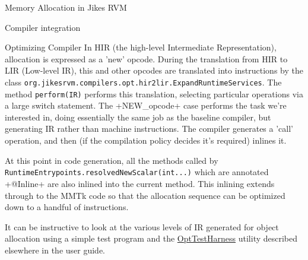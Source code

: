 \begin{section}{Memory Allocation in Jikes RVM}
\begin{subsection}{Compiler integration}
\begin{subsubsection}{Optimizing Compiler}
In HIR (the high-level Intermediate Representation), allocation is expressed as a 'new' opcode.  During the translation from HIR to LIR (Low-level IR), this and other opcodes are translated into instructions by the class \texttt{org.jikes\-rvm.com\-pi\-lers.opt.hir2lir.Ex\-pand\-Run\-time\-Ser\-vices}.  The method \texttt{per\-form(IR)} performs this translation, selecting particular operations via a large switch statement.  The \spverb+NEW_opcode+ case performs the task we're interested in, doing essentially the same job as the baseline compiler, but generating IR rather than machine instructions.  The compiler generates a 'call' operation, and then (if the compilation policy decides it's required) inlines it.

At this point in code generation, all the methods called by \texttt{Run\-ti\-me\-En\-try\-points.re\-sol\-ved\-New\-Sca\-lar(int...)} which are annotated \spverb+@Inline+ are also inlined into the current method.  This inlining extends through to the MMTk code so that the allocation sequence can be optimized down to a handful of instructions.

It can be instructive to look at the various levels of IR generated for object allocation using a simple test program and the \hyperref[sec:opttestharness]{OptTestHarness} utility described elsewhere in the user guide.

\end{subsubsection}

\end{subsection}

\end{section}
